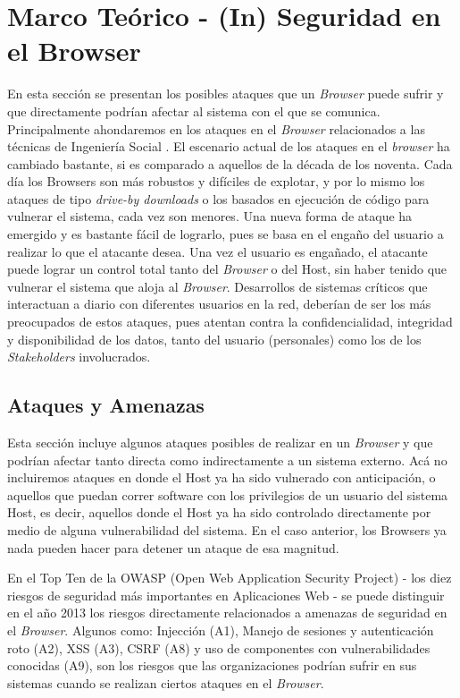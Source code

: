 \chapter{Marco Teórico - (In) Seguridad en el Browser}
\label{chap3:MT}


En esta sección se presentan los posibles ataques que un \textit{Browser} puede sufrir y que directamente podrían afectar al sistema con el que se comunica. Principalmente ahondaremos en los ataques en el \textit{Browser} relacionados a las técnicas de Ingeniería Social \cite{socEngineeering}. El escenario actual de los ataques en el \textit{browser} ha cambiado bastante, si es comparado a aquellos de la década de los noventa. Cada día los Browsers son más robustos y difíciles de explotar, y por lo mismo los ataques de tipo \textit{drive-by downloads} o los basados en ejecución de código para vulnerar el sistema, cada vez son menores. Una nueva forma de ataque ha emergido y es bastante fácil de lograrlo, pues se basa en el engaño del usuario a realizar lo que el atacante desea. Una vez el usuario es engañado, el atacante puede lograr un control total tanto del \textit{Browser} o del Host, sin haber tenido que vulnerar el sistema \cite{Rajab2013,Labs2013} que aloja al \textit{Browser}. Desarrollos de sistemas críticos que interactuan a diario con diferentes usuarios en la red, deberían de ser los más preocupados de estos ataques, pues atentan contra la confidencialidad, integridad y disponibilidad de los datos, tanto del usuario (personales) como los de los \textit{Stakeholders} involucrados.

\section{Ataques y Amenazas}
Esta sección incluye algunos ataques posibles de realizar en un \textit{Browser} y que podrían afectar tanto directa como indirectamente a un sistema externo. Acá no incluiremos ataques en donde el Host ya ha sido vulnerado con anticipación, o aquellos que puedan correr software con los privilegios de un usuario del sistema Host, es decir, aquellos donde el Host ya ha sido controlado directamente por medio de alguna vulnerabilidad del sistema. En el caso anterior, los Browsers ya nada pueden hacer para detener un ataque de esa magnitud.

En el Top Ten \cite{owaspTopTen} de la OWASP (Open Web Application Security Project) - los diez riesgos de seguridad más importantes en Aplicaciones Web - se puede distinguir en el año 2013 los riesgos directamente relacionados a amenazas de seguridad en el \textit{Browser}. Algunos como: Injección (A1), Manejo de sesiones y autenticación roto (A2), XSS (A3), CSRF (A8) y uso de componentes con vulnerabilidades conocidas (A9), son los riesgos que las organizaciones podrían sufrir en sus sistemas cuando se realizan ciertos ataques en el \textit{Browser}.

